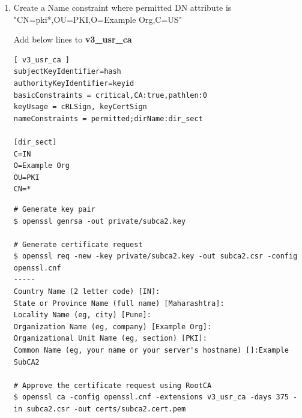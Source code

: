 \documentclass[a4paper]{article}
\begin{document}
\begin{enumerate}[label*=\arabic*.]
\begin{lstlisting}
[alt_names]
DNS.1 = *.example.org
       \end{lstlisting}
       \begin{lstlisting}[style=bashInputStyle]
#Generate key pair
$ openssl genrsa -out private/server3.key

# Generate Certificate request
$ openssl req -new -key private/server3.key -out server3.csr -config openssl.cnf
-----
Country Name (2 letter code) [IN]:
State or Province Name (full name) [Maharashtra]:
Locality Name (eg, city) [Pune]:
Organization Name (eg, company) [Example Org]:
Organizational Unit Name (eg, section) [PKI]:
Common Name (eg, your name or your server's hostname) []:server3.example.org

# Approve the certificate request by RootCA signing the request
$ openssl ca -config openssl.cnf -extensions server_cert -days 375 -in server3.csr -out certs/server3.cert.pem 

# View the certificate
$ openssl x509 -in certs/server3.cert.pem -noout -text
       \end{lstlisting}

    \item Create a Name constraint where permitted DN attribute is "CN=pki*,OU=PKI,O=Example Org,C=US"

            Add below lines to \textbf{v3\_usr\_ca} 
            \begin{lstlisting}
[ v3_usr_ca ]
subjectKeyIdentifier=hash
authorityKeyIdentifier=keyid
basicConstraints = critical,CA:true,pathlen:0
keyUsage = cRLSign, keyCertSign
nameConstraints = permitted;dirName:dir_sect

[dir_sect]
C=IN
O=Example Org
OU=PKI
CN=*
            \end{lstlisting}
            \begin{lstlisting}[style=bashInputStyle]
# Generate key pair
$ openssl genrsa -out private/subca2.key

# Generate certificate request
$ openssl req -new -key private/subca2.key -out subca2.csr -config openssl.cnf
-----
Country Name (2 letter code) [IN]:
State or Province Name (full name) [Maharashtra]:
Locality Name (eg, city) [Pune]:
Organization Name (eg, company) [Example Org]:
Organizational Unit Name (eg, section) [PKI]:
Common Name (eg, your name or your server's hostname) []:Example SubCA2

# Approve the certificate request using RootCA
$ openssl ca -config openssl.cnf -extensions v3_usr_ca -days 375 -in subca2.csr -out certs/subca2.cert.pem


\end{lstlisting}
\end{enumerate}
\end{document}
